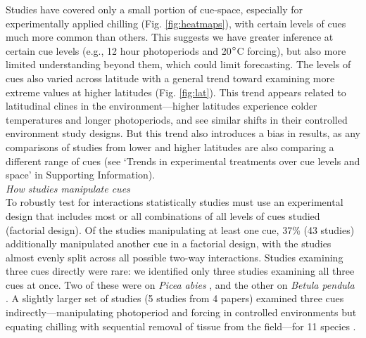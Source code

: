 \documentclass[11pt,letter]{article}
\newcommand{\R}[1]{\label{#1}\linelabel{#1}}
\begin{document}
Studies have covered only a small portion of cue-space, especially for experimentally applied chilling (Fig. \ref{fig:heatmaps}), with certain levels of cues much more common than others. This suggests we have greater inference at certain cue levels (e.g., 12 hour photoperiods and 20$\degree$C forcing), but also more limited understanding beyond them, which could limit forecasting. The levels of cues also varied across latitude with a general trend toward examining more extreme values at higher latitudes (Fig. \ref{fig:lat}). This trend appears related to latitudinal clines in the environment---higher latitudes experience colder temperatures and longer photoperiods, and see similar shifts in their controlled environment study designs. But this trend also introduces a bias in results, as any comparisons of studies from lower and higher latitudes are also comparing a different range of cues (see `Trends in experimental treatments over cue levels and space' in Supporting Information). \\

\emph{How studies manipulate cues}\\ %
To robustly test for interactions \R{R2comm}statistically studies must use an experimental design that includes most or all combinations of all levels of cues studied (factorial design). Of the studies manipulating at least one cue, 37\%  (43 studies) additionally manipulated another cue in a factorial design, with the studies almost evenly split across all possible two-way interactions. Studies examining three cues directly were rare: we identified only three studies examining all three cues at once. Two of these were on \emph{Picea abies} \citep{Worrall:1967aa,Sogaard:2008aa}, and the other on \emph{Betula pendula} \citep{Skuterud:1994aa}. A slightly larger set of studies (5 studies from 4 papers) examined three cues indirectly---manipulating photoperiod and forcing in controlled environments but equating chilling with sequential removal of tissue from the field---for 11 species \citep{Schnabel:1987aa,Heide:1993,Partanen:1998aa,Basler:2014aa}. \\
\end{document}
